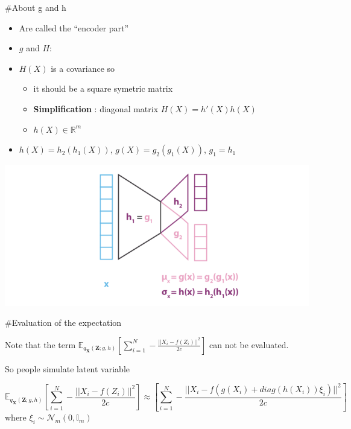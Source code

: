 \documentclass[
  12pt,
  ignorenonframetext,
  compress]{beamer}
\providecommand{\tightlist}{%
  \setlength{\itemsep}{0pt}\setlength{\parskip}{0pt}}
\begin{document}
\begin{frame}
\#About g and h

\begin{itemize}
\tightlist
\item
  Are called the ``encoder part''
\item
  \(g\) and \(H\):
\item
  \(H(X)\) is a covariance so

  \begin{itemize}
  \tightlist
  \item
    it should be a square symetric matrix
  \item
    \textbf{Simplification} : diagonal matrix \(H(X) = h'(X)h(X)\)
  \item
    \(h(X) \in \mathbb{R}^m\)
  \end{itemize}
\item
  \(h(X) = h_2(h_1(X))\), \(g(X) = g_2(g_1(X))\), \(g_1 = h_1\)
\end{itemize}

\begin{center}\includegraphics[width=0.9\linewidth]{images/approxZ} \end{center}
\end{frame}

\begin{frame}
\#Evaluation of the expectation

Note that the term
\(\mathbb{E}_{q_{\mathbf{X}}(\mathbf{Z};g,h)} \left[\sum_{i=1}^N - \frac{||X_i - f(Z_i)||^2}{2c}\right]\)
can not be evaluated.

So people simulate latent variable

\[\mathbb{E}_{q_{\mathbf{X}}(\mathbf{Z};g,h)}  \left[\sum_{i=1}^N - \frac{||X_i - f(Z_i)||^2}{2c}\right] \approx  \left[\sum_{i=1}^N - \frac{||X_i - f(g(X_i) + diag(h(X_i))\xi_i)||^2}{2c}\right]\]
where \(\xi_i\sim \mathcal{N}_m(0,\mathbb{I}_m)\)
\end{frame}
\end{document}
